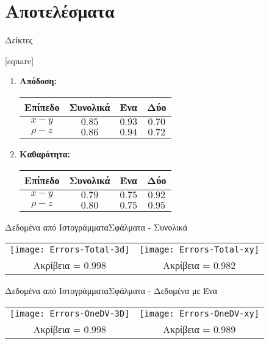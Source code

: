 \section{Αποτελέσματα}

\begin{frame}{Δείκτες}
	
	[square]

	\begin{enumerate}
		\item \textbf{Απόδοση:} 
			\\[2mm]
			\begin{tabular}{c c c c} \toprule
				Επίπεδο & Συνολικά & Ένα \dvtrue & Δύο \dvtrue \\ \midrule
				$x-y$ & $0.85$ & $0.93$ & $0.70$ \\ 
				$\rho-z$ & $0.86$ & $0.94$ & $0.72$ \\ \bottomrule
			\end{tabular}
			\vspace{4mm}
		\item \textbf{Καθαρότητα:} 
			\\[2mm]
			\begin{tabular}{c c c c} \toprule
				Επίπεδο & Συνολικά & Ένα \dvtrue & Δύο \dvtrue \\ \midrule
				$x-y$ & $0.79$ & $0.75$ & $0.92$ \\ 
				$\rho-z$ & $0.80$ & $0.75$ & $0.95$ \\ \bottomrule
			\end{tabular}	
	\end{enumerate}
\end{frame}

\beamerdefaultoverlayspecification{}

\begin{frame}{Δεδομένα από Ιστογράμματα}{Σφάλματα - Συνολικά}
	\centering
	\begin{tabular}{c c}
		\texttt{[image: Errors-Total-3d]} & 
		\texttt{[image: Errors-Total-xy]} \\[4mm]
		\small{Ακρίβεια = $0.998$} & \small{Ακρίβεια = $0.982$}
	\end{tabular}
\end{frame}

\begin{frame}{Δεδομένα από Ιστογράμματα}{Σφάλματα - Δεδομένα με Ένα \dvtrue}
	\centering
	\begin{tabular}{c c}
		\texttt{[image: Errors-OneDV-3D]} & 
		\texttt{[image: Errors-OneDV-xy]} \\[4mm]
		\small{Ακρίβεια = $0.998$} & \small{Ακρίβεια = $0.989$}
	\end{tabular}
\end{frame}


